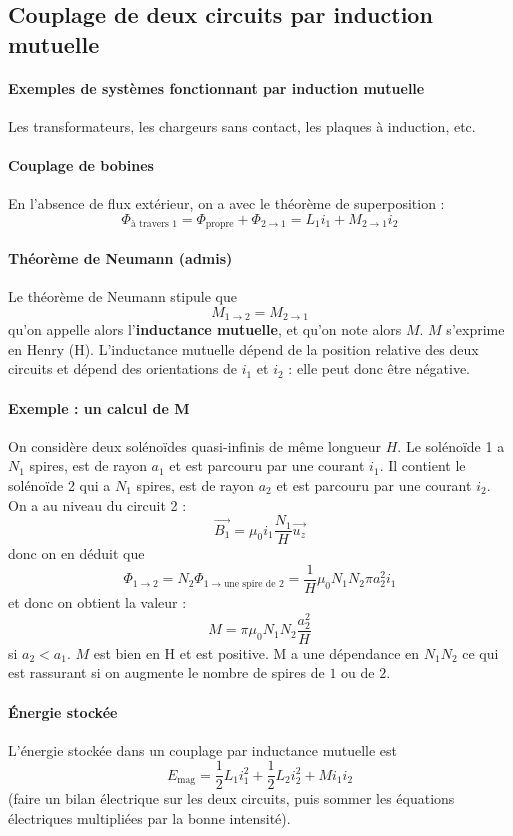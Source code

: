 \documentclass[french]{book}
\theoremstyle{plain}
\theoremstyle{definition}
\theoremstyle{remark}
\begin{document}
\subsection{Couplage de deux circuits par induction mutuelle}
\paragraph{Exemples de systèmes fonctionnant par induction mutuelle} Les transformateurs, les chargeurs sans contact, les plaques à induction, etc.
\paragraph{Couplage de bobines} En l’absence de flux extérieur, on a avec le théorème de superposition : $$\Phi_\text{à travers 1}=\Phi_\text{propre}+\Phi_{2\to 1}=L_1i_1+M_{2\to 1}i_2$$
\paragraph{Théorème de Neumann (admis)} Le théorème de Neumann stipule que $$M_{1\to 2}=M_{2\to 1}$$ qu'on appelle alors l'\textbf{inductance mutuelle}, et qu'on note alors $M$. $M$ s'exprime en Henry (H). L'inductance mutuelle dépend de la position relative des deux circuits et dépend des orientations de $i_1$ et $i_2$ : elle peut donc être négative.
\paragraph{Exemple : un calcul de M} On considère deux solénoïdes quasi-infinis de même longueur $H$. Le solénoïde 1 a $N_1$ spires, est de rayon $a_1$ et est parcouru par une courant $i_1$. Il contient le solénoïde 2 qui a $N_1$ spires, est de rayon $a_2$ et est parcouru par une courant $i_2$. On a au niveau du circuit 2 : $$\overrightarrow{B_1}=\mu_0i_1\frac{N_1}{H}\overrightarrow{u_z}$$ donc on en déduit que $$\Phi_{1\to 2}=N_2\Phi_{1\to \text{une spire de }2}=\frac{1}{H}\mu_0N_1N_2\pi a_2^2i_1$$ et donc on obtient la valeur : $$M=\pi\mu_0N_1N_2\frac{a_2^2}{H}$$ si $a_2<a_1$. $M$ est bien en H et est positive. M a une dépendance en $N_1N_2$ ce qui est rassurant si on augmente le nombre de spires de $1$ ou de $2$.
\paragraph{Énergie stockée} L'énergie stockée dans un couplage par inductance mutuelle est $$E_\text{mag}=\frac{1}{2}L_1i_1^2+\frac{1}{2}L_2i_2^2+Mi_1i_2$$ (faire un bilan électrique sur les deux circuits, puis sommer les équations électriques multipliées par la bonne intensité).
\end{document}

